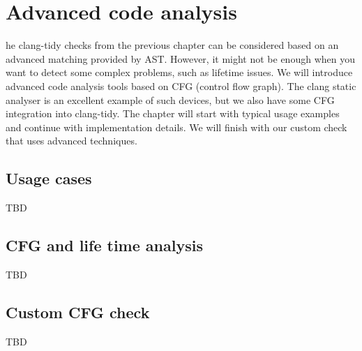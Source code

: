 \chapter{\textbf{Advanced code analysis}}
\pagestyle{fancy}
\fancyhf{}
\rhead{\thepage}
he clang-tidy checks from the previous chapter can be considered based on an
advanced matching provided by AST. However, it might not be enough when you want
to detect some complex problems, such as lifetime issues. We will introduce
advanced code analysis tools based on CFG (control flow graph). The clang static
analyser is an excellent example of such devices, but we also have some CFG
integration into clang-tidy. The chapter will start with typical usage examples
and continue with implementation details. We will finish with our custom check
that uses advanced techniques. 


\section{Usage cases}
TBD

\section{CFG and life time analysis}
TBD

\section{Custom CFG check}
TBD
